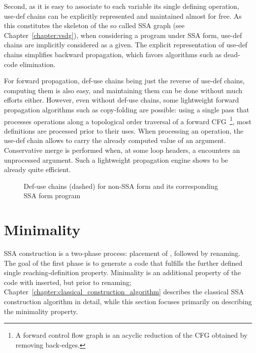 Second, as it is easy to associate to each variable its single defining operation, use-def chains can be explicitly represented and maintained almost for free. As this constitutes the skeleton of the so called SSA graph (see Chapter~\ref{chapter:vsdg}), when considering a program under SSA form, use-def chains are implicitly considered as a given. 
The explicit representation of use-def chains simplifies backward 
propagation, which favors algorithms such as dead-code elimination. 

For forward propagation, def-use chains being just the reverse of use-def chains, computing them is also easy, and maintaining them can be done without much efforts either. 
However, even without def-use chains, some lightweight forward propagation algorithms such as copy-folding are possible:
using a single pass that processes operations along a topological order traversal of a forward CFG~\footnote{A forward control flow graph is an acyclic reduction of the CFG obtained by removing back-edges.}, most definitions are processed prior to their uses. 
When processing an operation, the use-def chain allows to carry the already computed value of an argument. Conservative merge is performed when, at some loop headers, a \phifun encounters an unprocessed argument.
Such a lightweight  propagation engine shows to be already quite efficient.


\begin{figure}
\caption{Def-use chains (dashed) for non-SSA form and its corresponding SSA form program} 
\label{fig:properties_and_flavors:du} 
\end{figure}



\section{Minimality}
\label{sec:properties_and_flavors:minimality}

SSA construction is a two-phase process: placement of \phifuns,
followed by renaming. The goal of the first phase is to generate a code that fulfills the further defined single reaching-definition property. Minimality is an additional property of the code with 
\phifuns inserted, but prior to renaming; Chapter~\ref{chapter:classical_construction_algorithm} describes the classical SSA
construction algorithm in detail, while this section focuses
primarily on describing the minimality property.  

